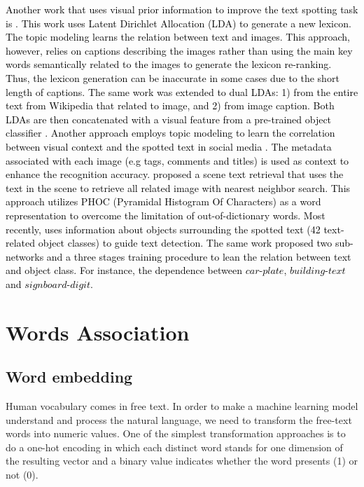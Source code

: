 \documentclass[phd,tocprelim]{cornell}
\begin{document}
 \textcolor{black}{Another work that  uses visual prior information to improve the text spotting task is \cite{Yash:16}. This work uses Latent Dirichlet Allocation (LDA) \cite{David:03} to generate a new lexicon. The topic modeling learns the relation between text and images. This approach, however, relies on captions describing the images rather than using the main key words semantically related to the images to generate the lexicon re-ranking. Thus, the lexicon generation can be inaccurate in some cases due to the short length of captions. The same work was  extended to dual LDAs: 1) from the entire text from Wikipedia that related to image, and 2) from image caption. Both LDAs are then concatenated with a visual feature from a pre-trained object classifier \cite{patel2019self}. Another approach employs topic modeling to learn the correlation between visual context and the spotted text in social media \cite{kang2017detection}. The metadata associated with each image (e.g tags, comments and titles) is used as context to enhance the recognition accuracy. \cite{GomezMaflaECCV2018single} proposed  a scene text retrieval that uses the text in the scene to retrieve all related image with nearest neighbor search. This approach utilizes PHOC (Pyramidal Histogram Of Characters) as a word representation to overcome the limitation of out-of-dictionary words. Most recently, \cite{prasad_2018_ECCV} uses information about objects surrounding the spotted text (42 text-related object classes) to guide text detection. The same work proposed two sub-networks and a three stages training procedure to lean the relation between text and object class. For instance, the dependence between $car$-$plate$, $building$-$text$ and $sign board$-$digit$.}



\section{Words Association} %
\subsection{Word embedding}

Human vocabulary comes in free text. In order to make a machine learning model understand and process the natural language, we need to transform the free-text words into numeric values. One of the simplest transformation approaches is to do a one-hot encoding in which each distinct word stands for one dimension of the resulting vector and a binary value indicates whether the word presents (1) or not (0).
\end{document}
